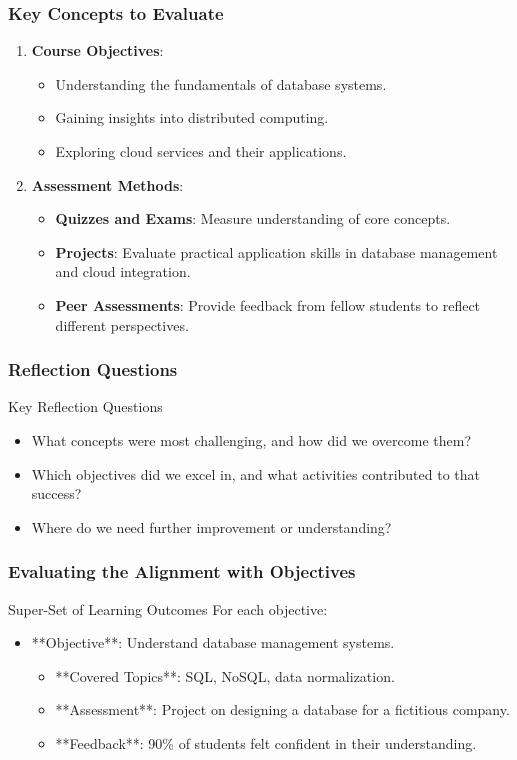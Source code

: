\documentclass[aspectratio=169]{beamer}
\begin{document}
\begin{frame}[fragile]
  \frametitle{Key Concepts to Evaluate}
  \begin{enumerate}
    \item \textbf{Course Objectives}:
    \begin{itemize}
      \item Understanding the fundamentals of database systems.
      \item Gaining insights into distributed computing.
      \item Exploring cloud services and their applications.
    \end{itemize}
    
    \item \textbf{Assessment Methods}:
    \begin{itemize}
      \item \textbf{Quizzes and Exams}: Measure understanding of core concepts.
      \item \textbf{Projects}: Evaluate practical application skills in database management and cloud integration.
      \item \textbf{Peer Assessments}: Provide feedback from fellow students to reflect different perspectives.
    \end{itemize}
  \end{enumerate}
\end{frame}

\begin{frame}[fragile]
  \frametitle{Reflection Questions}
  \begin{block}{Key Reflection Questions}
    \begin{itemize}
      \item What concepts were most challenging, and how did we overcome them?
      \item Which objectives did we excel in, and what activities contributed to that success?
      \item Where do we need further improvement or understanding?
    \end{itemize}
  \end{block}
\end{frame}

\begin{frame}[fragile]
  \frametitle{Evaluating the Alignment with Objectives}
  \begin{block}{Super-Set of Learning Outcomes}
    For each objective:
    \begin{itemize}
      \item **Objective**: Understand database management systems.
      \begin{itemize}
        \item **Covered Topics**: SQL, NoSQL, data normalization.
        \item **Assessment**: Project on designing a database for a fictitious company.
        \item **Feedback**: 90\% of students felt confident in their understanding.
      \end{itemize}
    \end{itemize}
  \end{block}
\end{frame}
\end{document}

